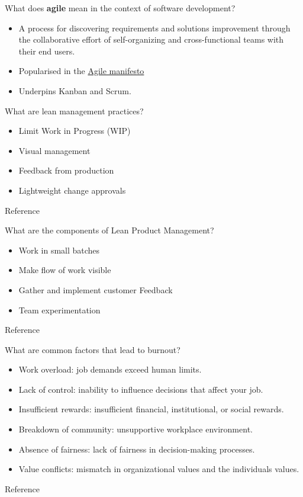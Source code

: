 \begin{questions}
\question What does \textbf{agile} mean in the context of software development?
\begin{solution}
\begin{itemize}
    \item A process for discovering requirements and solutions improvement through the collaborative effort of self-organizing and cross-functional teams with their end users.
    \item Popularised in the \href{http://agilemanifesto.org/}{Agile manifesto}
    \item Underpins Kanban and Scrum.
\end{itemize}
\end{solution}

\question[4] What are lean management practices?
\begin{solution}
\begin{itemize}
    \item Limit Work in Progress (WIP)
    \item Visual management
    \item Feedback from production
    \item Lightweight change approvals
\end{itemize}
Reference \cite[p.~76]{accel}
\end{solution}

\question[4] What are the components of Lean Product Management?
\begin{solution}
\begin{itemize}
    \item Work in small batches
    \item Make flow of work visible
    \item Gather and implement customer Feedback
    \item Team experimentation
\end{itemize}
Reference \cite[p.~85]{accel}
\end{solution}

\question[6] What are common factors that lead to burnout?
\begin{solution}
\begin{itemize}
    \item Work overload: job demands exceed human limits.
    \item Lack of control: inability to influence decisions that affect your job.
    \item Insufficient rewards: insufficient financial, institutional, or social rewards.
    \item Breakdown of community: unsupportive workplace environment.
    \item Absence of fairness: lack of fairness in decision-making processes.
    \item Value conflicts: mismatch in organizational values and the individuals values.
\end{itemize}
Reference \cite[p.~96]{accel}
\end{solution}


\end{questions}
